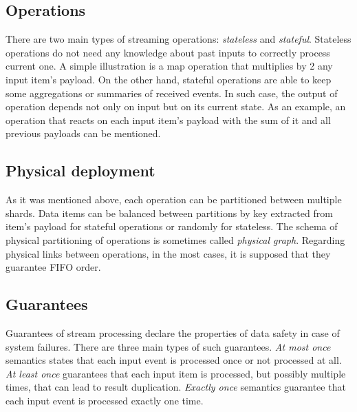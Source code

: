\subsection{Operations}
There are two main types of streaming operations: {\it stateless} and {\it stateful}. Stateless operations do not need any knowledge about past inputs to correctly process current one. A simple illustration is a map operation that multiplies by 2 any input item's payload. On the other hand, stateful operations are able to keep some aggregations or summaries of received events. In such case, the output of operation depends not only on input but on its current state. As an example, an operation that reacts on each input item's payload with the sum of it and all previous payloads can be mentioned. 

\subsection{Physical deployment}
As it was mentioned above, each operation can be partitioned between multiple shards. Data items can be balanced between partitions by key extracted from item's payload for stateful operations or randomly for stateless. The schema of physical partitioning of operations is sometimes called {\it physical graph}. Regarding physical links between operations, in the most cases, it is supposed that they guarantee FIFO order.

\subsection{Guarantees}
Guarantees of stream processing declare the properties of data safety in case of system failures. There are three main types of such guarantees. {\it At most once} semantics states that each input event is processed once or not processed at all. {\it At least once} guarantees that each input item is processed, but possibly multiple times, that can lead to result duplication. {\it Exactly once} semantics guarantee that each input event is processed exactly one time.  
